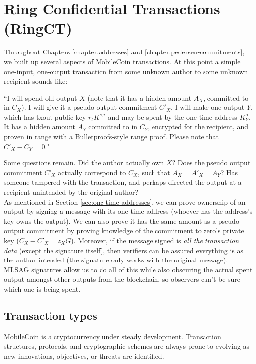 \chapter{Ring Confidential Transactions (RingCT)}
\label{chapter:transactions}

Throughout Chapters \ref{chapter:addresses} and \ref{chapter:pedersen-commitments}, we built up several aspects of MobileCoin transactions. At this point a simple one-input, one-output transaction from some unknown author to some unknown recipient sounds like:

``I will spend old output $X$ (note that it has a hidden amount $A_X$, committed to in $C_X$). I will give it a pseudo output commitment $C'_X$. I will make one output $Y$, which has txout public key $r_t K^{s,i}$ and may be spent by the one-time address $K^o_Y$. It has a hidden amount $A_Y$ committed to in $C_Y$, encrypted for the recipient, and proven in range with a Bulletproofs-style range proof. Please note that $C'_X - C_Y = 0$."

Some questions remain. Did the author actually own $X$? Does the pseudo output commitment $C'_X$ actually correspond to $C_X$, such that $A_X = A'_X = A_Y$? Has someone tampered with the transaction, and perhaps directed the output at a recipient unintended by the original author?
\\

As mentioned in Section \ref{sec:one-time-addresses}, we can prove ownership of an output by signing a message with its one-time address (whoever has the address's key owns the output). We can also prove it has the same amount as a pseudo output commitment by proving knowledge of the commitment to zero's private key ($C_X - C'_X = z_X G$). Moreover, if the message signed is {\em all the transaction data} (except the signature itself), then verifiers can be assured everything is as the author intended (the signature only works with the original message). MLSAG signatures allow us to do all of this while also obscuring the actual spent output amongst other outputs from the blockchain, so observers can't be sure which one is being spent.



\section{Transaction types}
\label{sec:transaction_types}

MobileCoin is a cryptocurrency under steady development. Transaction structures, protocols, and cryptographic schemes are always prone to evolving as new innovations, objectives, or threats are identified.

